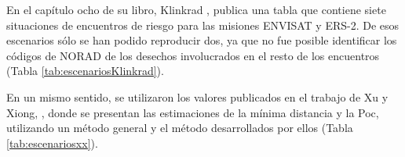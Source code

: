 \begin{table}[!h]
 \caption{Casos de Prueba tomados del servicio SOCRATES (Celestrack.com).}
\label{tab:escenariosSOCRATES}
\end{table}

En el cap\'itulo ocho de su libro, Klinkrad \citep{Klinkrad}, publica una tabla que contiene siete situaciones de encuentros de riesgo para las misiones ENVISAT y ERS-2. De esos escenarios s\'olo se han podido reproducir dos, ya que no fue posible identificar los c\'odigos de NORAD de los desechos involucrados en el resto de los encuentros (Tabla \ref{tab:escenariosKlinkrad}).

\begin{table}[!h]
 \caption{Casos de prueba tomados del libro de Klinkrad \citep{Klinkrad}.}
\label{tab:escenariosKlinkrad}
\end{table}

En un mismo sentido, se utilizaron los valores publicados en el trabajo de Xu y  Xiong, \citep{xu2014method}, donde  se presentan las estimaciones de la m\'inima distancia y la Poc, utilizando un m\'etodo general y el m\'etodo desarrollados por ellos (Tabla \ref{tab:escenariosxx}).\\

